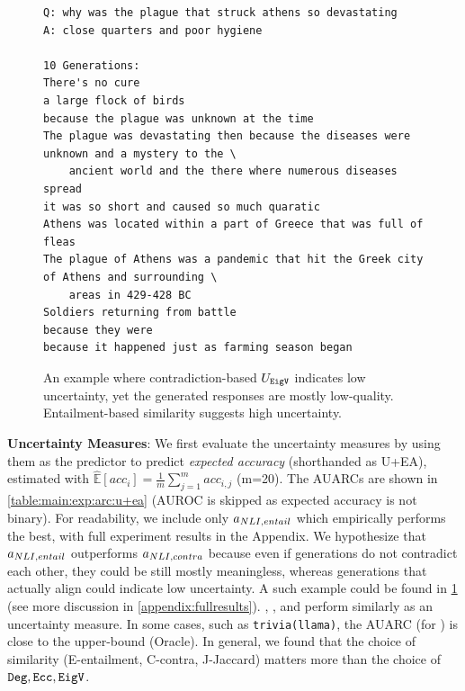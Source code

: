 \begin{figure}[htb]
  \centering
  \begin{minipage}{\textwidth}
  {\small
        \begin{verbatim}
Q: why was the plague that struck athens so devastating
A: close quarters and poor hygiene

10 Generations:
There's no cure
a large flock of birds
because the plague was unknown at the time
The plague was devastating then because the diseases were unknown and a mystery to the \
    ancient world and the there where numerous diseases spread
it was so short and caused so much quaratic
Athens was located within a part of Greece that was full of fleas
The plague of Athens was a pandemic that hit the Greek city of Athens and surrounding \ 
    areas in 429-428 BC
Soldiers returning from battle
because they were
because it happened just as farming season began
        \end{verbatim}
}
  \end{minipage}
  \caption{An example where contradiction-based $U_{\texttt{EigV}}$ indicates low uncertainty, %
  yet the generated responses are mostly low-quality.
  Entailment-based similarity suggests high uncertainty. %
  }
  \label{example:lowcontra:main}
\end{figure}

\textbf{Uncertainty Measures}:
We first evaluate the uncertainty measures by using them as the predictor to predict \textit{expected accuracy} (shorthanded as U+EA), estimated with $\hat{\mathbb{E}}[acc_i] = \frac{1}{m}\sum_{j=1}^{m} acc_{i,j}$ (m=20).
The AUARCs are shown in \cref{table:main:exp:arc:u+ea} (AUROC is skipped as expected accuracy is not binary).
For readability, we include only $a_{NLI,entail}$ which empirically performs the best, with full experiment results in the Appendix. 
We hypothesize that $a_{NLI,entail}$ outperforms $a_{NLI,contra}$ because even if generations do not contradict each other, they could be still mostly meaningless, whereas generations that actually align could indicate low uncertainty.
A such example could be found in \cref{example:lowcontra:main} (see more discussion in \cref{appendix:fullresults}).
\methodDegree, \methodEcc, and \methodEigvClip perform similarly as an uncertainty measure.
In some cases, such as \texttt{trivia(llama)}, the AUARC (for \methodDegree) is close to the upper-bound (Oracle). 
In general, we found that the choice of similarity (E-entailment, C-contra, J-Jaccard) matters more than the choice of $\texttt{Deg},\texttt{Ecc},\texttt{EigV}$.

